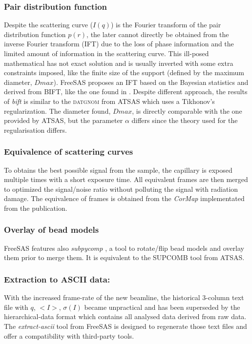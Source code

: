 \documentclass[preprint]{iucr}              %
\begin{document}
\subsubsection{Pair distribution function}
Despite the scattering curve ($I(q)$) is the Fourier transform of the pair distribution function $p(r)$, the later cannot directly be obtained from the
inverse Fourier transform (IFT) due to the loss of phase information and the limited amount of information in the scattering curve. 
This ill-posed mathematical has not exact solution and is usually inverted with some extra constraints imposed, like the finite size of the support (defined by the maximum diameter, $Dmax$).    
FreeSAS proposes an IFT based on the Bayesian statistics and derived from BIFT\cite{bift}, like the one found in \cite{bioxtasraw}.
Despite different approach, the results of \textit{bift} is similar to the \textsc{datgnom} \cite{ATSAS1} from ATSAS which uses a Tikhonov's regularization.
The diameter found, $Dmax$, is directly comparable with the one provided by ATSAS, but the parameter $\alpha$ differs since the theory used for the regularisation differs. 

\subsubsection{Equivalence of scattering curves}
To obtains the best possible signal from the sample, the capillary is exposed multiple times with a short exposure time.
All equivalent frames are then merged to optimized the signal/noise ratio without polluting the signal with radiation damage.  
The equivalence of frames is obtained from the \textit{CorMap} \cite{cormap} implementated from the publication. 

\subsubsection{Overlay of bead models}
FreeSAS features also \textit{subpycomp} \cite{BM29ODA}, a tool to rotate/flip bead models and overlay them prior to merge them. It is equivalent to the SUPCOMB\cite{supcomb} tool from ATSAS. 

\subsubsection{Extraction to ASCII data:} With the increased frame-rate of the new beamline, the historical 3-column text file with $q$, $<I>$, $\sigma(I)$ became unpractical and has been superseded by the hierarchical-data format \cite{hdf5} which contains all analysed data derived from raw data.
The \textit{extract-ascii} tool from FreeSAS is designed to regenerate those text files and offer a compatibility with third-party tools.
\end{document}
